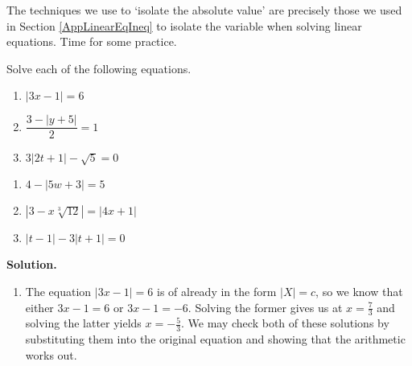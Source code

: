 \documentclass{ximera}
\begin{document}
\smallskip

The techniques we use to `isolate the absolute value' are precisely those we used in Section \ref{AppLinearEqIneq} to isolate the variable when solving linear equations.  Time for some practice.

\enlargethispage{.5in}

\begin{example} \label{absvalueeqnex}  Solve each of the following equations.

\vspace*{-.1in}

\begin{multicols}{3}
\begin{enumerate}

\item  $|3x-1| = 6$
\item  $\dfrac{3 - |y+5|}{2} = 1$
\item  $3|2t+1| - \sqrt{5} = 0$

\setcounter{HW}{\value{enumi}}
\end{enumerate}
\end{multicols}

\vspace*{-.3in}

\begin{multicols}{3}
\begin{enumerate}
\setcounter{enumi}{\value{HW}}

\item  $4 - |5w+3| = 5$

\item  $\left|3 - x \sqrt[3]{12}\right| = |4x+1|$

\item  $|t-1| - 3|t+1| = 0$

\end{enumerate}
\end{multicols}

\pagebreak

{\bf Solution.} 

\begin{enumerate}

\item  The equation  $|3x-1| = 6$ is of already in the form $|X| = c$, so we know that either $3x-1=6$ or $3x-1 = -6$.  Solving the former gives us at $x = \frac{7}{3}$ and solving the latter yields $x = -\frac{5}{3}$.  We may check both of these solutions by substituting them into the original equation and showing that the arithmetic works out.


\end{enumerate}
\end{example}
\end{document}
